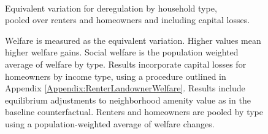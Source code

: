 \documentclass[12pt]{article}
\begin{document}
	
	\begin{figure}[htbp!]
		\begin{center}
			\caption{ \\ Equivalent variation for deregulation by household type, \\ pooled over renters and homeowners and including capital losses. }\label{figure:welfarePooled_nopercent_ctfl}
		\end{center}
		\caption*{Welfare is measured as the equivalent variation. Higher values mean higher welfare gains. Social welfare is the population weighted average of welfare by type. Results incorporate capital losses for homeowners by income type, using a procedure outlined in Appendix \ref{Appendix:RenterLandownerWelfare}. Results include equilibrium adjustments to neighborhood amenity value as in the baseline counterfactual. Renters and homeowners are pooled by type using a population-weighted average of welfare changes.}
	\end{figure}
	
\end{document}
